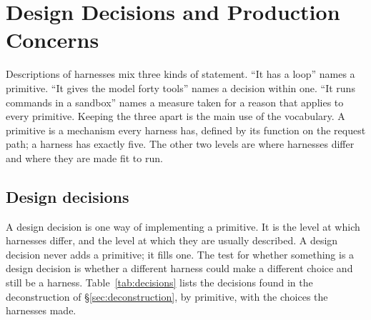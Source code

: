 \section{Design Decisions and Production Concerns}
\label{sec:levels}

Descriptions of harnesses mix three kinds of statement. ``It has a loop'' names a primitive. ``It gives the model forty tools'' names a decision within one. ``It runs commands in a sandbox'' names a measure taken for a reason that applies to every primitive. Keeping the three apart is the main use of the vocabulary. A primitive is a mechanism every harness has, defined by its function on the request path; a harness has exactly five. The other two levels are where harnesses differ and where they are made fit to run.

\subsection{Design decisions}
A design decision is one way of implementing a primitive. It is the level at which harnesses differ, and the level at which they are usually described. A design decision never adds a primitive; it fills one. The test for whether something is a design decision is whether a different harness could make a different choice and still be a harness. Table~\ref{tab:decisions} lists the decisions found in the deconstruction of \S\ref{sec:deconstruction}, by primitive, with the choices the harnesses made.

